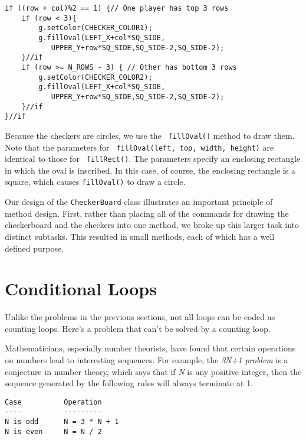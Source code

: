 \begin{jjjlisting}
\begin{lstlisting}
if ((row + col)%2 == 1) {// One player has top 3 rows
    if (row < 3){
        g.setColor(CHECKER_COLOR1);
        g.fillOval(LEFT_X+col*SQ_SIDE,
           UPPER_Y+row*SQ_SIDE,SQ_SIDE-2,SQ_SIDE-2);
    }//if
    if (row >= N_ROWS - 3) { // Other has bottom 3 rows
        g.setColor(CHECKER_COLOR2);
        g.fillOval(LEFT_X+col*SQ_SIDE,
           UPPER_Y+row*SQ_SIDE,SQ_SIDE-2,SQ_SIDE-2);
    }//if
}//if
\end{lstlisting}
\end{jjjlisting}

\noindent Because the checkers are circles, we use the {\tt
fillOval()} method to draw them. Note that the parameters for {\tt
fillOval(left, top, width, height)} are identical to those for {\tt
fillRect()}. The parameters specify an enclosing rectangle in which
the oval is inscribed.  In this case, of course, the enclosing
rectangle is a square, which causes {\tt fillOval()} to draw a
circle.

Our design of the {\tt CheckerBoard} class illustrates an important
principle of method design. First, rather than placing all of the
commands for drawing the checkerboard and the checkers into one
method, we broke up this larger task into distinct subtasks. This
resulted in small methods, each of which has a well defined purpose.


\section{Conditional Loops}
\noindent Unlike the problems in the previous sections, not all loops can be
coded as counting loops. Here's a problem that can't be solved by a
counting loop.

Mathematicians, especially number theorists, have found that certain
operations on numbers lead to interesting sequences.  For example, the
{\it 3N+1 problem} is a conjecture in number theory, which says that
if {\it N} is any positive integer, then the sequence generated by the
following rules will always terminate at 1.


\begin{jjjlisting}
\begin{lstlisting}
Case          Operation
----          ---------
N is odd      N = 3 * N + 1
N is even     N = N / 2
\end{lstlisting}
\end{jjjlisting}

